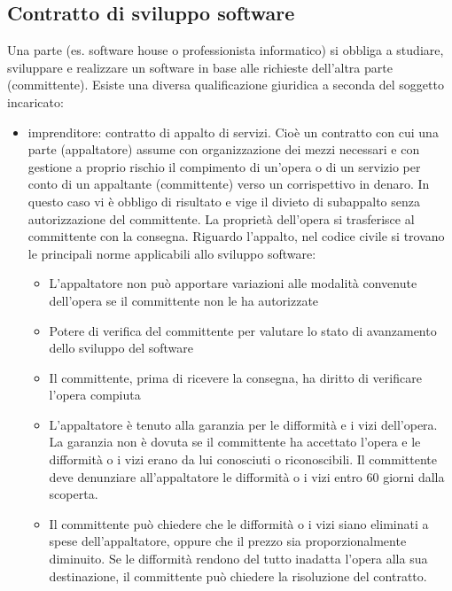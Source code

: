 \subsection{Contratto di sviluppo software}
Una parte (es. software house o professionista informatico) si obbliga a studiare, sviluppare e realizzare un software in base alle richieste dell'altra parte (committente).\newline
Esiste una diversa qualificazione giuridica a seconda del soggetto incaricato:
\begin{itemize}
    \item imprenditore: contratto di appalto di servizi. Cioè un contratto con cui una parte (appaltatore) assume con organizzazione dei mezzi
    necessari e con gestione a proprio rischio il compimento di un'opera o di un servizio per conto di un appaltante (committente) verso un corrispettivo
    in denaro. In questo caso vi è obbligo di risultato e vige il divieto di subappalto senza autorizzazione del committente.\newline
    La proprietà dell'opera si trasferisce al committente con la consegna.\newline
    Riguardo l'appalto, nel codice civile si trovano le principali norme applicabili allo sviluppo software:
    \begin{itemize}
        \item L'appaltatore non può apportare variazioni alle modalità convenute dell'opera se il committente non le ha autorizzate
        \item Potere di verifica del committente per valutare lo stato di avanzamento dello sviluppo del software
        \item Il committente, prima di ricevere la consegna, ha diritto di verificare l'opera compiuta
        \item L'appaltatore è tenuto alla garanzia per le difformità e i vizi dell'opera. La garanzia non è dovuta se il committente ha
        accettato l'opera e le difformità o i vizi erano da lui conosciuti o riconoscibili. Il committente deve denunziare all'appaltatore le
        difformità o i vizi entro 60 giorni dalla scoperta.
        \item Il committente può chiedere che le difformità o i vizi siano eliminati a spese dell'appaltatore, oppure che il prezzo
        sia proporzionalmente diminuito. Se le difformità rendono del tutto inadatta l'opera alla sua destinazione, il committente può chiedere la
        risoluzione del contratto.
    \end{itemize}

\end{itemize}
